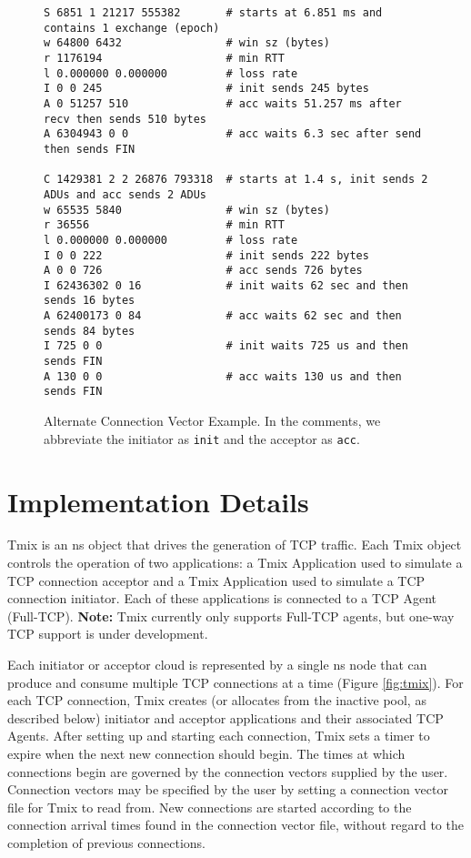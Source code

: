 \begin{figure}
\makebox[\columnwidth]{\hrulefill}
\small
\begin{verbatim}
S 6851 1 21217 555382       # starts at 6.851 ms and contains 1 exchange (epoch)
w 64800 6432                # win sz (bytes)
r 1176194                   # min RTT
l 0.000000 0.000000         # loss rate
I 0 0 245                   # init sends 245 bytes
A 0 51257 510               # acc waits 51.257 ms after recv then sends 510 bytes
A 6304943 0 0               # acc waits 6.3 sec after send then sends FIN

C 1429381 2 2 26876 793318  # starts at 1.4 s, init sends 2 ADUs and acc sends 2 ADUs
w 65535 5840                # win sz (bytes)
r 36556                     # min RTT
l 0.000000 0.000000         # loss rate
I 0 0 222                   # init sends 222 bytes
A 0 0 726                   # acc sends 726 bytes
I 62436302 0 16             # init waits 62 sec and then sends 16 bytes
A 62400173 0 84             # acc waits 62 sec and then sends 84 bytes
I 725 0 0                   # init waits 725 us and then sends FIN
A 130 0 0                   # acc waits 130 us and then sends FIN
\end{verbatim}
\makebox[\columnwidth]{\hrulefill}
\caption{\label{alt-cvec}Alternate Connection Vector Example.
In the comments, we abbreviate the initiator as \texttt{init} and the
acceptor as \texttt{acc}.}
\end{figure}

\section{Implementation Details}

Tmix is an ns object that drives the generation of TCP traffic. Each
Tmix object controls the operation of two applications: a Tmix
Application used to simulate a TCP connection acceptor and a Tmix
Application used to simulate a TCP connection initiator. Each of these
applications is connected to a TCP Agent (Full-TCP).  {\bf Note:} Tmix
currently only supports Full-TCP agents, but one-way TCP support is under development.

Each initiator or acceptor cloud is represented by a single ns node
that can produce and consume multiple TCP connections at a time
(Figure \ref{fig:tmix}). For each TCP connection, Tmix creates (or
allocates from the inactive pool, as described below) initiator and
acceptor applications and their associated TCP Agents. After setting up
and starting each connection, Tmix sets a timer to expire when
the next new connection should begin. The times at which connections begin
are governed by the connection vectors supplied by the user.  Connection
vectors may be specified by the user by setting a connection vector file for 
Tmix to read from.  New connections are started according to the connection 
arrival times found in the connection vector file, without regard to the 
completion of previous connections.

